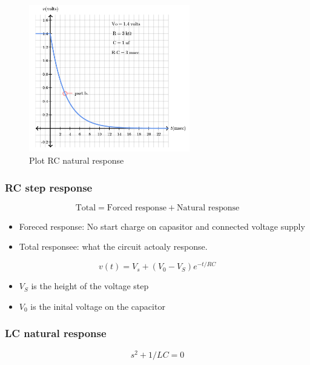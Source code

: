 \documentclass{article}
\begin{document}
\begin{figure}[h]
    \centering
    \includegraphics[width=7cm]{image/plot_RC_natural_response.png}
    \caption{Plot RC natural response}
\end{figure}

\newpage
\subsubsection{RC step response}
\begin{equation}
    \text{Total} = \text{Forced response} + \text{Natural response} 
\end{equation}
\begin{itemize}
    \item Foreced response: No start charge on capasitor and connected voltage supply
    \item Total responsee: what the circuit actoaly response.
\end{itemize}

\begin{equation}
  v(t) = V_s + (V_0-V_S)e^{-t/RC}
\end{equation}
\begin{itemize}
    \item $V_S$ is the height of the voltage step
    \item $V_0$ is the inital voltage on the capacitor
\end{itemize}

\subsubsection{LC natural response}
\begin{equation}
  s^2 + 1/LC = 0
\end{equation}
\end{document}
